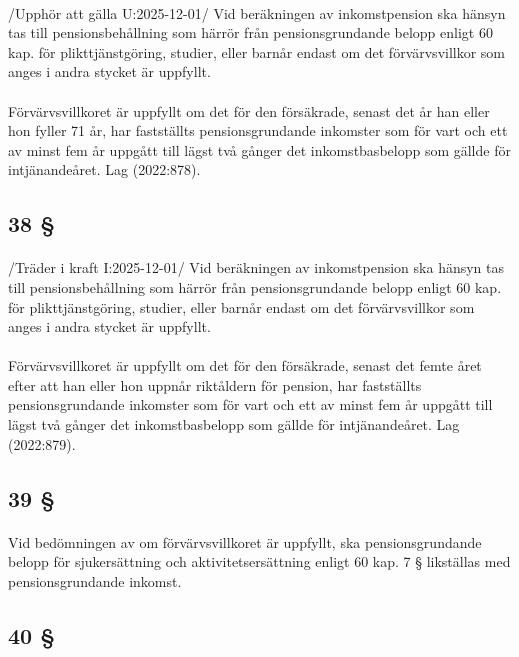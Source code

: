 \documentclass[a4paper,notitlepage,openany,10pt]{book}
\begin{document}
\paragraph*{}
/Upphör att gälla U:2025-12-01/
Vid beräkningen av inkomstpension ska hänsyn tas till pensionsbehållning som härrör från pensionsgrundande belopp enligt 60 kap. för plikttjänstgöring, studier, eller barnår endast om det förvärvsvillkor som anges i andra stycket är uppfyllt.
\paragraph*{}
Förvärvsvillkoret är uppfyllt om det för den försäkrade, senast det år han eller hon fyller 71 år, har fastställts pensionsgrundande inkomster som för vart och ett av minst fem år uppgått till lägst två gånger det inkomstbasbelopp som gällde för intjänandeåret.
Lag (2022:878).
\subsection*{38 §}
\paragraph*{}
/Träder i kraft I:2025-12-01/
Vid beräkningen av inkomstpension ska hänsyn tas till pensionsbehållning som härrör från pensionsgrundande belopp enligt 60 kap. för plikttjänstgöring, studier, eller barnår endast om det förvärvsvillkor som anges i andra stycket är uppfyllt.
\paragraph*{}
Förvärvsvillkoret är uppfyllt om det för den försäkrade, senast det femte året efter att han eller hon uppnår riktåldern för pension, har fastställts pensionsgrundande inkomster som för vart och ett av minst fem år uppgått till lägst två gånger det inkomstbasbelopp som gällde för intjänandeåret.
Lag (2022:879).
\subsection*{39 §}
\paragraph*{}
Vid bedömningen av om förvärvsvillkoret är uppfyllt, ska pensionsgrundande belopp för sjukersättning och aktivitetsersättning enligt 60 kap. 7 § likställas med pensionsgrundande inkomst.
\subsection*{40 §}
\end{document}
